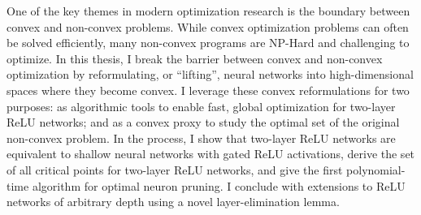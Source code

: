 

One of the key themes in modern optimization research is the boundary between
convex and non-convex problems.
While convex optimization problems can often be solved efficiently, many
non-convex programs are NP-Hard and challenging to optimize.
In this thesis, I break the barrier between convex and non-convex optimization
by reformulating, or ``lifting'', neural networks into high-dimensional spaces
where they become convex.
I leverage these convex reformulations for two purposes: as algorithmic tools
to enable fast, global optimization for two-layer ReLU networks; and as a
convex proxy to study the optimal set of the original non-convex problem.
In the process, I show that two-layer ReLU networks are equivalent to shallow
neural networks with gated ReLU activations, derive the set of all critical
points for two-layer ReLU networks, and give the first polynomial-time
algorithm for optimal neuron pruning.
I conclude with extensions to ReLU networks of arbitrary depth using a novel
layer-elimination lemma.
